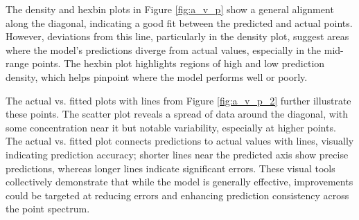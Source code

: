 \documentclass{article}
\begin{document}
The density and hexbin plots in Figure \ref{fig:a_v_p} show a general alignment along the diagonal, indicating a good fit between the predicted and actual points. However, deviations from this line, particularly in the density plot, suggest areas where the model's predictions diverge from actual values, especially in the mid-range points. The hexbin plot highlights regions of high and low prediction density, which helps pinpoint where the model performs well or poorly.

The actual vs. fitted plots with lines from Figure \ref{fig:a_v_p_2} further illustrate these points. The scatter plot reveals a spread of data around the diagonal, with some concentration near it but notable variability, especially at higher points. The actual vs. fitted plot connects predictions to actual values with lines, visually indicating prediction accuracy; shorter lines near the predicted axis show precise predictions, whereas longer lines indicate significant errors. These visual tools collectively demonstrate that while the model is generally effective, improvements could be targeted at reducing errors and enhancing prediction consistency across the point spectrum.
\end{document}
